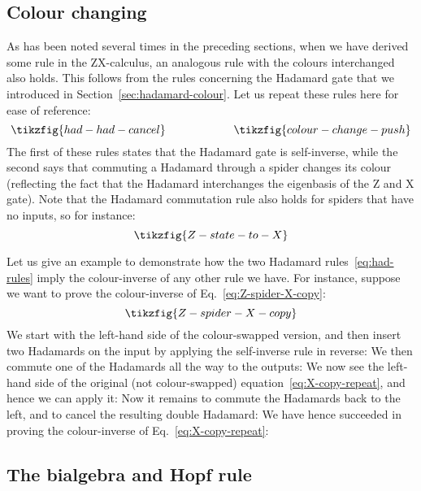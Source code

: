 \documentclass[a4paper,onecolumn,superscriptaddress,11pt,%
				unpublished,%
				allowfontchageintitle,%
				]{quantumarticle}
\begin{document}
\subsection{Colour changing}
As has been noted several times in the preceding sections, when we have derived some rule in the ZX-calculus, an analogous rule with the colours interchanged also holds. This follows from the rules concerning the Hadamard gate that we introduced in Section~\ref{sec:hadamard-colour}. Let us repeat these rules here for ease of reference:
\begin{equation}\label{eq:had-rules}
	\tikzfig{had-had-cancel}\qquad\qquad\qquad \tikzfig{colour-change-push}
\end{equation}
The first of these rules states that the Hadamard gate is self-inverse, while the second says that commuting a Hadamard through a spider changes its colour (reflecting the fact that the Hadamard interchanges the eigenbasis of the Z and X gate).
Note that the Hadamard commutation rule also holds for spiders that have no inputs, so for instance:
\begin{equation}\label{eq:Z-state-to-X}
\tikzfig{Z-state-to-X}
\end{equation}


Let us give an example to demonstrate how the two Hadamard rules~\eqref{eq:had-rules} imply the colour-inverse of any other rule we have.
For instance, suppose we want to prove the colour-inverse of Eq.~\eqref{eq:Z-spider-X-copy}:
\begin{equation}\label{eq:X-copy-repeat}
\tikzfig{Z-spider-X-copy}
\end{equation}
We start with the left-hand side of the colour-swapped version, and then insert two Hadamards on the input by applying the self-inverse rule in reverse:
We then commute one of the Hadamards all the way to the outputs:
We now see the left-hand side of the original (not colour-swapped) equation~\eqref{eq:X-copy-repeat}, and hence we can apply it:
Now it remains to commute the Hadamards back to the left, and to cancel the resulting double Hadamard:
We have hence succeeded in proving the colour-inverse of Eq.~\eqref{eq:X-copy-repeat}:



\subsection{The bialgebra and Hopf rule}\label{sec:bialgebra-hopf}
\end{document}
